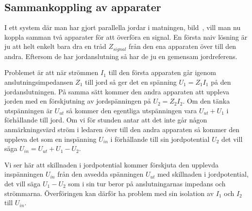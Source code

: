 \subsection{Sammankoppling av apparater}
\label{sammankopplingavapparater}

I ett system där man har gjort parallella jordar i matningen,
bild~, vill man nu koppla samman två apparater för att
överföra en signal.
En första naiv lösning är ju att helt enkelt bara dra en tråd \(Z_{signal}\)
från den ena apparaten över till den andra.
Eftersom de har jordanslutning så har de ju en gemensam jordreferens.


Problemet är att när strömmen \(I_1\) till den första apparaten går igenom
anslutningsimpedansen \(Z_1\) till jord så ger det en spänning
\(U_1 = Z_1 I_1\) på den jordanslutningen.
På samma sätt kommer den andra apparaten att uppleva jorden med en förskjutning
av jordspänningen på \(U_2 = Z_2 I_2\).
Om den tänka utspänningen är \(U_{ut}\) så kommer den egentliga utspänningen
vara \(U_{ut} + U_1\) i förhållande till jord.
Om vi för stunden antar att det inte går någon anmärkningsvärd ström i ledaren
över till den andra apparaten så kommer den uppleva det som en inspänning
\(U_{in}\) i förhållande till sin jordpotential \(U_2\) det vill säga
\(U_{in} = U_{ut} + U_1 - U_2\).

Vi ser här att skillnaden i jordpotential kommer förskjuta den upplevda
inspänningen \(U_{in}\) från den avsedda spänningen \(U_{ut}\) med skillnaden i
jordpotential, det vill säga \(U_1 - U_2\) som i sin tur beror på
anslutningarnas impedans och strömmarna.
Överföringen kan därför ha problem med sin isolation av \(I_1\) och \(I_2\)
till \(U_{in}\).

